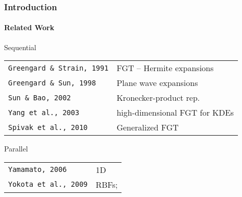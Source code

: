\begin{frame}
\frametitle{Introduction }
\framesubtitle{Related Work}
\begin{block}{Sequential}
{\footnotesize
\begin{table}[htbp]
\centering
\begin{tabular}{ll} 
\texttt{Greengard \& Strain, 1991} & FGT -- Hermite expansions \\
\texttt{Greengard \& Sun, 1998} & Plane wave expansions \\
\texttt{Sun \& Bao, 2002} & Kronecker-product rep. \\
\texttt{Yang et al., 2003} & high-dimensional FGT for KDEs \\ 
\texttt{Spivak et al., 2010} & Generalized FGT \\
\end{tabular}
\end{table}
}
\end{block}

\begin{block}{Parallel}
{\footnotesize
\begin{table}[htbp]
\centering
\begin{tabular}{ll} 
\texttt{Yamamato, 2006} & 1D \\
\texttt{Yokota et al., 2009} & RBFs; \\
\end{tabular}
\end{table}
}

\end{block}
\end{frame}

